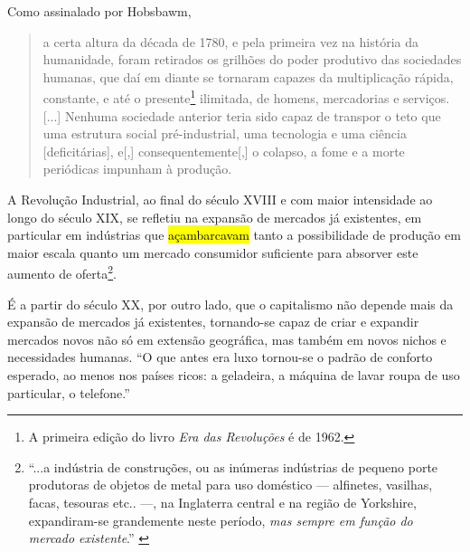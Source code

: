 Como assinalado por Hobsbawm,
\begin{quote}
    a certa altura da década de 1780, e pela primeira vez na história da humanidade, foram retirados os grilhões do poder produtivo das sociedades humanas, que daí em diante se tornaram capazes da multiplicação rápida, constante, e até o presente\footnote{A primeira edição do livro \textit{Era das Revoluções} é de 1962.} ilimitada, de homens, mercadorias e serviços. [...] Nenhuma sociedade anterior teria sido capaz de transpor o teto que uma estrutura social pré-industrial, uma tecnologia e uma ciência [deficitárias], e[,] consequentemente[,] o colapso, a fome e a morte periódicas impunham à produção. \parencite[p. 59]{Hobsbawm2014}
\end{quote}

A Revolução Industrial, ao final do século XVIII e com maior intensidade ao longo do século XIX, se refletiu na expansão de mercados já existentes, em particular em indústrias que \hl{açambarcavam} tanto a possibilidade de produção em maior escala quanto um mercado consumidor suficiente para absorver este aumento de oferta\footnote{``...a indústria de construções, ou as inúmeras indústrias de pequeno porte produtoras de objetos de metal para uso doméstico --- alfinetes, vasilhas, facas, tesouras etc.. ---, na Inglaterra central e na região de Yorkshire, expandiram-se grandemente neste período, \textit{mas sempre em função do mercado existente}.'' \parencite[p. 65, grifo meu]{Hobsbawm2014}%
}.

É a partir do século XX, por outro lado, que o capitalismo não depende mais da expansão de mercados já existentes, tornando-se capaz de criar e expandir mercados novos não só em extensão geográfica, mas também em novos nichos e necessidades humanas. ``O que antes era luxo tornou-se o padrão de conforto esperado, ao menos nos países ricos: a geladeira, a máquina de lavar roupa de uso particular, o telefone.'' \parencite[p. 264]{Hobsbawm2011}


